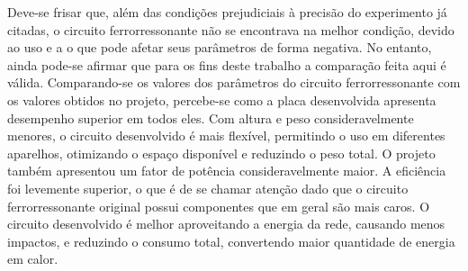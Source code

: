 Deve-se frisar que, além das condições prejudiciais à precisão do experimento já citadas, o circuito ferrorressonante não se encontrava na melhor condição, devido ao uso e a  o que pode afetar seus parâmetros de forma negativa. No entanto, ainda pode-se afirmar que para os fins deste trabalho a comparação feita aqui é válida. Comparando-se os valores dos parâmetros do circuito ferrorressonante com os valores obtidos no projeto, percebe-se como a placa desenvolvida apresenta desempenho superior em todos eles. Com altura e peso consideravelmente menores, o circuito desenvolvido é mais flexível, permitindo o uso em diferentes aparelhos, otimizando o espaço disponível e reduzindo o peso total. O projeto também apresentou um fator de potência consideravelmente maior. A eficiência foi levemente superior, o que é de se chamar atenção dado que o circuito ferrorressonante original possui componentes que em geral são mais caros. O circuito desenvolvido é melhor aproveitando a energia da rede, causando menos impactos, e reduzindo o consumo total, convertendo maior quantidade de energia em calor.
